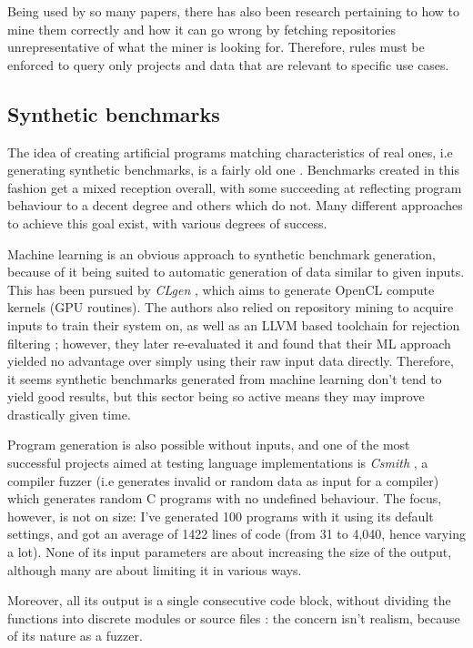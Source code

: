 \documentclass[12pt]{article}
\begin{document}
Being used by so many papers, there has also been research pertaining to how to mine them correctly and how it can go wrong \cite{github-mining-perils} \cite{repo-mining-challenges} by fetching repositories unrepresentative of what the miner is looking for. Therefore, rules must be enforced to query only projects and data that are relevant to specific use cases.


\subsection{Synthetic benchmarks}
The idea of creating artificial programs matching characteristics of real ones, i.e generating synthetic benchmarks, is a fairly old one \cite{a_synthetic_benchmark}. Benchmarks created in this fashion get a mixed reception overall, with some succeeding at reflecting program behaviour to a decent degree and others which do not. Many different approaches to achieve this goal exist, with various degrees of success.

\bigskip

Machine learning is an obvious approach to synthetic benchmark generation, because of it being suited to automatic generation of data similar to given inputs. This has been pursued by \textit{CLgen} \cite{clgen}, which aims to generate OpenCL compute kernels (GPU routines). The authors also relied on repository mining to acquire inputs to train their system on, as well as an LLVM based toolchain for rejection filtering ; however, they later re-evaluated it \cite{clgen_case_study} and found that their ML approach yielded no advantage over simply using their raw input data directly. Therefore, it seems synthetic benchmarks generated from machine learning don't tend to yield good results, but this sector being so active means they may improve drastically given time.

\bigskip
Program generation is also possible without inputs, and one of the most successful projects aimed at testing language implementations is \textit{Csmith} \cite{csmith}, a compiler fuzzer (i.e generates invalid or random data as input for a compiler) which generates random C programs with no undefined behaviour. The focus, however, is not on size: I've generated 100 programs with it using its default settings, and got an average of 1422 lines of code (from 31 to 4,040, hence varying a lot). None of its input parameters are about increasing the size of the output, although many are about limiting it in various ways. 

Moreover, all its output is a single consecutive code block, without dividing the functions into discrete modules or source files : the concern isn't realism, because of its nature as a fuzzer.
\end{document}
